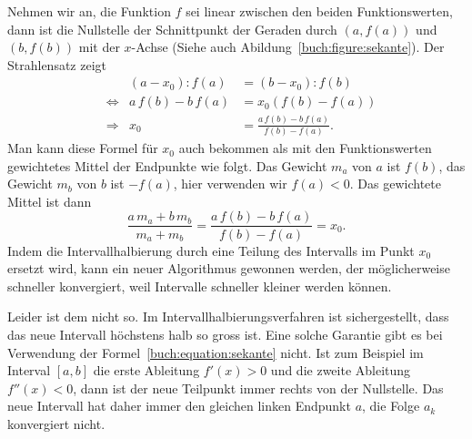 Nehmen wir an, die Funktion $f$ sei linear zwischen den beiden
Funktionswerten, dann ist die Nullstelle der Schnittpunkt
der Geraden durch $(a,f(a))$ und $(b,f(b))$ mit der $x$-Achse
(Siehe auch Abildung~\ref{buch:figure:sekante}).
Der Strahlensatz zeigt
\[
\begin{aligned}
&&
(a-x_0) : f(a)
&=
(b - x_0) : f(b)
\\
&\Leftrightarrow&
a\,f(b) - b\,f(a)
&=
x_0(f(b)-f(a))
\\
&\Rightarrow&
x_0
&=
\frac{a\,f(b)-b\,f(a)}{f(b)-f(a)}.
\end{aligned}
\]
Man kann diese Formel für $x_0$ auch bekommen als mit den
Funktionswerten gewichtetes Mittel der Endpunkte wie folgt.
Das Gewicht $m_a$ von $a$ ist $f(b)$, das Gewicht $m_b$ von
$b$ ist $-f(a)$, hier verwenden wir $f(a)<0$.
Das gewichtete Mittel ist dann
\begin{equation}
\frac{a\,m_a+b\,m_b}{m_a+m_b}
=
\frac{a\,f(b)-b\,f(a)}{f(b)-f(a)}=x_0.
\label{buch:equation:sekante}
\end{equation}
Indem die Intervallhalbierung durch eine Teilung des
Intervalls im Punkt $x_0$ ersetzt wird, kann ein neuer Algorithmus
gewonnen werden, der möglicherweise schneller konvergiert, weil
Intervalle schneller kleiner werden können.

Leider ist dem nicht so.
Im Intervallhalbierungsverfahren ist sichergestellt, dass das neue
Intervall höchstens halb so gross ist.
Eine solche Garantie gibt es bei Verwendung der
Formel~\eqref{buch:equation:sekante} nicht.
Ist zum Beispiel im Interval $[a,b]$ die erste Ableitung $f'(x)>0$ und
die zweite Ableitung $f''(x)<0$,
dann ist der neue Teilpunkt immer rechts von der Nullstelle.
Das neue Intervall hat daher immer den gleichen linken Endpunkt $a$,
die Folge $a_k$ konvergiert nicht.

